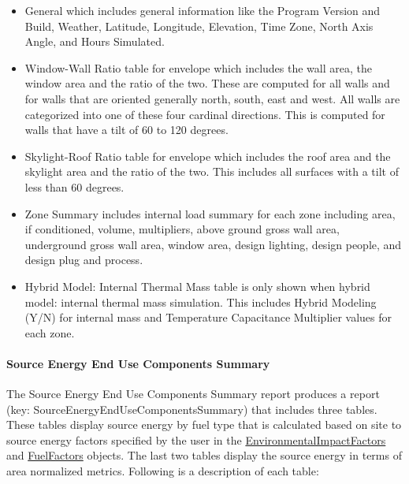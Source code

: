 \begin{itemize}
\item
  General which includes general information like the Program Version and Build, Weather, Latitude, Longitude, Elevation, Time Zone, North Axis Angle, and Hours Simulated.
\item
  Window-Wall Ratio table for envelope which includes the wall area, the window area and the ratio of the two. These are computed for all walls and for walls that are oriented generally north, south, east and west. All walls are categorized into one of these four cardinal directions. This is computed for walls that have a tilt of 60 to 120 degrees.
\item
  Skylight-Roof Ratio table for envelope which includes the roof area and the skylight area and the ratio of the two. This includes all surfaces with a tilt of less than 60 degrees.
\item
  Zone Summary includes internal load summary for each zone including area, if conditioned, volume, multipliers, above ground gross wall area, underground gross wall area, window area, design lighting, design people, and design plug and process.
\item
  Hybrid Model: Internal Thermal Mass table is only shown when hybrid model: internal thermal mass simulation. This includes Hybrid Modeling (Y/N) for internal mass and Temperature Capacitance Multiplier values for each zone.
\end{itemize}

\paragraph{Source Energy End Use Components Summary}\label{source-energy-end-use-components-summary}

The Source Energy End Use Components Summary report produces a report (key: SourceEnergyEndUseComponentsSummary) that includes three tables. These tables display source energy by fuel type that is calculated based on site to source energy factors specified by the user in the \hyperref[environmentalimpactfactors]{EnvironmentalImpactFactors} and \hyperref[fuelfactors]{FuelFactors} objects. The last two tables display the source energy in terms of area normalized metrics. Following is a description of each table:

